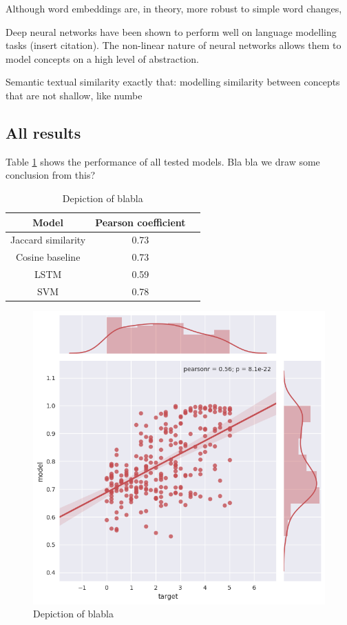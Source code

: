 \documentclass[10pt, a4paper]{article}
\begin{document}
\begin{table}[h!]
Although word embeddings are, in theory, more robust to simple word changes,



Deep neural networks have been shown to perform well on language modelling tasks
(insert citation). 
The non-linear nature of neural networks allows them to model concepts on a high level of abstraction.

Semantic textual similarity exactly that: modelling similarity between concepts that are not shallow, like numbe

\subsection{All results}

Table \ref{tab:all_results} shows the performance of all tested models.
Bla bla we draw some conclusion from this?
\begin{table}
	\caption{Model comparison}
\label{tab:all_results}
\begin{center}
\begin{tabular}{ccc}
\toprule
Model & Pearson coefficient \\
\midrule
Jaccard similarity & 0.73 \\
Cosine baseline & 0.73 \\
LSTM & 0.59 \\
SVM & 0.78 \\
\bottomrule
\end{tabular}
\end{center}
\end{table}


\newpage
\begin{figure}
	\begin{center}
	\includegraphics[width=\columnwidth]{only_2nd_layer.png}
	\caption{Depiction of blabla}
	\label{fig:lstm_2nd_layer}
	\end{center}
\end{figure}




\end{table}
\end{document}
